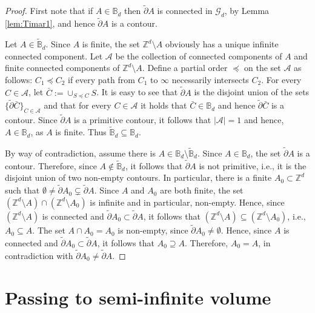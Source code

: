 \documentclass[11pt, reqno]{amsart}
\numberwithin{equation}{section}
\begin{document}
\begin{proof}
First note that if $A\in{\mathbb B}_d$ then  $\tilde{\partial}A$ is connected in ${\mathcal G}_d$, 
by Lemma \ref{lem:Timar1}, 
and hence $\tilde{\partial}A$ is a contour.

Let $A\in\tilde{\mathbb B}_d$. 
Since $A$ is finite, 
the set ${\mathbb Z}^d\setminus A$ obviously has a unique infinite connected component. 
Let ${\mathcal A}$ be the collection of connected components of $A$ and finite connected components of ${\mathbb Z}^d\setminus A$.
Define a partial order $\preceq$ on the set $\mathcal A$ as follows: $C_1\preceq C_2$ if every path from $C_1$ to $\infty$ necessarily intersects $C_2$.
For every $C\in{\mathcal A}$, 
let $\bar{C}:=\cup_{S\preceq C}S$.
It is easy to see that  $\tilde{\partial}A$ is the disjoint union of the sets $\{\tilde{\partial}\bar{C}\}_{C\in{\mathcal A}}$ and that for every $C\in{\mathcal A}$ it holds that $\bar{C}\in{\mathbb B}_d$ and hence $\tilde{\partial}\bar{C}$ is a contour. 
Since $\tilde{\partial}A$ is a primitive contour, it follows that $\lvert{\mathcal A}\rvert=1$ and hence, $A\in{\mathbb B}_d$, as $A$ is finite.
Thus $\tilde{\mathbb B}_d\subseteq{\mathbb B}_d$.

By way of contradiction, 
assume there is $A\in{\mathbb B}_d\setminus\tilde{\mathbb B}_d$. 
Since $A\in{\mathbb B}_d$, 
the set $\tilde{\partial}A$ is a contour.
Therefore, since $A\notin\tilde{\mathbb B}_d$, 
it follows that $\tilde{\partial}A$ is not primitive, 
i.e., it is the disjoint union of two non-empty contours. 
In particular, there is a finite $A_0\subset{\mathbb Z}^d$ such that $\emptyset\neq\tilde{\partial}A_0\subsetneq \tilde{\partial}A$.
Since $A$ and $A_0$ are both finite, 
the set $({\mathbb Z}^d\setminus A)\cap({\mathbb Z}^d\setminus A_0)$ is infinite and in particular, non-empty.
Hence, since $({\mathbb Z}^d\setminus A)$ is connected and $\tilde{\partial}A_0\subset \tilde{\partial}A$, 
it follows that $({\mathbb Z}^d\setminus A)\subseteq({\mathbb Z}^d\setminus A_0)$, i.e., $A_0\subseteq A$.
The set $A\cap A_0=A_0$ is non-empty, since $\tilde{\partial}A_0\neq\emptyset$.
Hence, since $A$ is connected and $\tilde{\partial}A_0\subset \tilde{\partial}A$, it follows that $A_0\supseteq A$.
Therefore, $A_0=A$, in contradiction with $\tilde{\partial}A_0\neq \tilde{\partial}A$.
\end{proof}

\section{Passing to semi-infinite volume}\label{sec:small lemmas}
\end{document}
